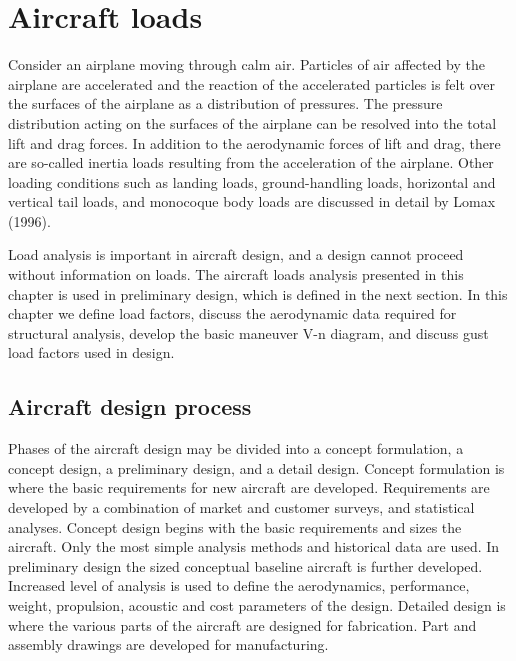\documentclass{AeroStructure-ERJohnson}
\begin{document}
\mainmatter
\setcounter{page}{7}

\setcounter{chapter}{1}

\chapter{Aircraft loads}\label{ch2}

Consider an airplane moving through calm air. Particles of air affected by the airplane are accelerated and the reaction of the accelerated particles is felt over the surfaces of the airplane as a distribution of pressures. The pressure distribution acting on the surfaces of the airplane can be resolved into the total lift and drag forces. In addition to the aerodynamic forces of lift and drag, there are so-called inertia loads resulting from the acceleration of the airplane. Other loading conditions such as landing loads, ground-handling loads, horizontal and vertical tail loads, and monocoque body loads are discussed in detail by Lomax (1996).

Load analysis is important in aircraft design, and a design cannot proceed without information on loads. The aircraft loads analysis presented in this chapter is used in preliminary design, which is defined in the next section. In this chapter we define load factors, discuss the aerodynamic data required for structural analysis, develop the basic maneuver V-n diagram, and discuss gust load factors used in design.

\section{Aircraft design process}\label{sec2.1}

Phases of the aircraft design may be divided into a concept formulation, a concept design, a preliminary design, and a detail design. Concept formulation is where the basic requirements for new aircraft are developed. Requirements are developed by a combination of market and customer surveys, and statistical analyses. Concept design begins with the basic requirements and sizes the aircraft. Only the most simple analysis methods and historical data are used. In preliminary design the sized conceptual baseline aircraft is further developed. Increased level of analysis is used to define the aerodynamics, performance, weight, propulsion, acoustic and cost parameters of the design. Detailed design is where the various parts of the aircraft are designed for fabrication. Part and assembly drawings are developed for manufacturing.
\end{document}
